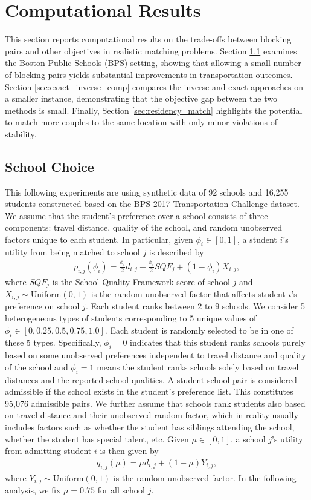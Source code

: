 \documentclass[11pt]{article}
\begin{document}
\section{Computational Results}
This section reports computational results on the trade-offs between blocking pairs and other objectives in realistic matching problems. Section \ref{sec:sch_results} examines the Boston Public Schools (BPS) setting, showing that allowing a small number of blocking pairs yields substantial improvements in transportation outcomes. Section \ref{sec:exact_inverse_comp} compares the inverse and exact approaches on a smaller instance, demonstrating that the objective gap between the two methods is small. Finally, Section \ref{sec:residency_match} highlights the potential to match more couples to the same location with only minor violations of stability.

\subsection{School Choice} \label{sec:sch_results}
This following experiments are using synthetic data of 92 schools and 16,255 students constructed based on the BPS 2017 Transportation Challenge dataset.
We assume that the student’s preference over a school consists of three components:
travel distance, quality of the school, and random unobserved factors unique to each student. 
In particular, given $\phi_i \in [0,1]$, a student $i$'s utility from being matched to school $j$ is described by 
\begin{align} \label{stu_pref}
    p_{i,j}(\phi_i) = \frac{\phi_i}{2}d_{i,j} + \frac{\phi_i}{2} SQF_j + (1-\phi_i)X_{i,j},
\end{align}
where $SQF_j$ is the School Quality Framework score of school $j$ and $X_{i,j} \sim \text{Uniform}(0,1)$ is the random unobserved factor that affects student $i$'s preference on school $j$. 
Each student ranks between 2 to 9 schools. 
We consider 5 heterogeneous types of students corresponding to 5 unique values of $\phi_i \in [0, 0.25, 0.5, 0.75, 1.0]$. Each student is randomly selected to be in one of these 5 types. Specifically, $\phi_i= 0$ indicates that this student ranks schools purely based on some unobserved preferences independent to travel distance and quality of the school and $\phi_i = 1$ means the student ranks schools solely based on travel distances and the reported school qualities.
A student-school pair is considered admissible if the school exists in the student's preference list. This constitutes 95,076 admissible pairs. 
We further assume that schools rank students also based on travel distance and their unobserved random factor, which in reality usually includes factors such as whether the student has siblings attending the school, whether the student has special talent, etc. Given $\mu \in [0,1]$, a school $j$'s utility from admitting student $i$ is then given by 
\begin{align}\label{sch_pref}
q_{i,j}(\mu) = \mu d_{i,j} + (1-\mu) Y_{i,j},
\end{align}
where $Y_{i,j} \sim \text{Uniform}(0,1)$ is the random unobserved factor. In the following analysis, we fix $\mu = 0.75$ for all school $j$.
\end{document}
